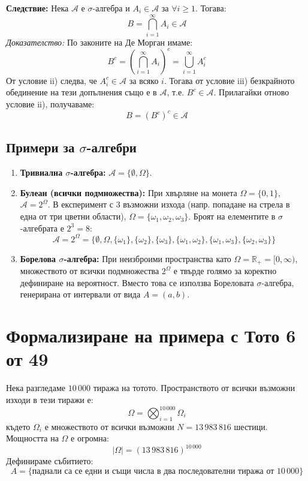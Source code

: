 \documentclass{article}
\begin{document}
\textbf{Следствие:} Нека $\mathcal{A}$ е $\sigma$-алгебра и $A_i \in \mathcal{A}$ за $\forall i \ge 1$. Тогава:
\[ B = \bigcap_{i=1}^{\infty} A_i \in \mathcal{A} \]
\emph{Доказателство:}
По законите на Де Морган имаме:
\[ B^c = \left( \bigcap_{i=1}^{\infty} A_i \right)^c = \bigcup_{i=1}^{\infty} A_i^c \]
От условие ii) следва, че $A_i^c \in \mathcal{A}$ за всяко $i$. Тогава от условие iii) безкрайното обединение на тези допълнения също е в $\mathcal{A}$, т.е. $B^c \in \mathcal{A}$. Прилагайки отново условие ii), получаваме:
\[ B = (B^c)^c \in \mathcal{A} \]

\subsection*{Примери за $\sigma$-алгебри}
\begin{enumerate}
    \item \textbf{Тривиална $\sigma$-алгебра:} $\mathcal{A} = \{ \emptyset, \Omega \}$.
    \item \textbf{Булеан (всички подмножества):} При хвърляне на монета $\Omega = \{ 0, 1 \}$, $\mathcal{A} = 2^\Omega$. 
    В експеримент с 3 възможни изхода (напр. попадане на стрела в една от три цветни области), $\Omega = \{ \omega_1, \omega_2, \omega_3 \}$. Броят на елементите в $\sigma$-алгебрата е $2^3 = 8$:
    \[ \mathcal{A} = 2^\Omega = \{ \emptyset, \Omega, \{ \omega_1 \}, \{ \omega_2 \}, \{ \omega_3 \}, \{ \omega_1, \omega_2 \}, \{ \omega_1, \omega_3 \}, \{ \omega_2, \omega_3 \} \} \]
    \item \textbf{Борелова $\sigma$-алгебра:} При неизброими пространства като $\Omega = \mathbb{R}_+ = [0, \infty)$, множеството от всички подмножества $2^\Omega$ е твърде голямо за коректно дефиниране на вероятност. Вместо това се използва Бореловата $\sigma$-алгебра, генерирана от интервали от вида $A = (a, b)$.
\end{enumerate}

\section{Формализиране на примера с Тото 6 от 49}
Нека разгледаме $10\,000$ тиража на тотото. Пространството от всички възможни изходи в тези тиражи е:
\[ \Omega = \bigotimes_{i=1}^{10\,000} \Omega_i \]
където $\Omega_i$ е множеството от всички възможни $N = 13\,983\,816$ шестици. Мощността на $\Omega$ е огромна:
\[ |\Omega| = (13\,983\,816)^{10\,000} \]
Дефинираме събитието:
\[ A = \{ \text{паднали са се едни и същи числа в два последователни тиража от } 10\,000 \} \]
\end{document}
